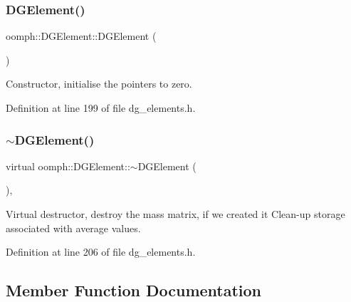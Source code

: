 \subsubsection{\texorpdfstring{D\+G\+Element()}{DGElement()}}
{\footnotesize\ttfamily oomph\+::\+D\+G\+Element\+::\+D\+G\+Element (\begin{DoxyParamCaption}{ }\end{DoxyParamCaption})\hspace{0.3cm}{\ttfamily [inline]}}



Constructor, initialise the pointers to zero. 



Definition at line 199 of file dg\+\_\+elements.\+h.

\mbox{\label{classoomph_1_1DGElement_acfb3e165aa49a619e11d5ce77f580f33}} 
\subsubsection{\texorpdfstring{$\sim$\+D\+G\+Element()}{~DGElement()}}
{\footnotesize\ttfamily virtual oomph\+::\+D\+G\+Element\+::$\sim$\+D\+G\+Element (\begin{DoxyParamCaption}{ }\end{DoxyParamCaption})\hspace{0.3cm}{\ttfamily [inline]}, {\ttfamily [virtual]}}



Virtual destructor, destroy the mass matrix, if we created it Clean-\/up storage associated with average values. 



Definition at line 206 of file dg\+\_\+elements.\+h.



\subsection{Member Function Documentation}
\mbox{\label{classoomph_1_1DGElement_a5eaf138a13233e7a3eeb86ccda8d6edb}} 
